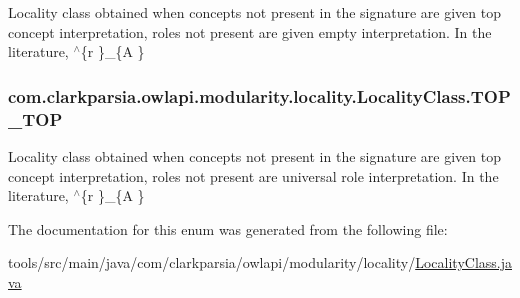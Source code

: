 Locality class obtained when concepts not present in the signature are given top concept interpretation, roles not present are given empty interpretation. In the literature, $^\wedge$\{r  \}\-\_\-\{A  \} \hypertarget{enumcom_1_1clarkparsia_1_1owlapi_1_1modularity_1_1locality_1_1_locality_class_a5ec2368660cbebbd0dab9e6a4df1bcb7}{
\subsubsection[{T\-O\-P\-\_\-\-T\-O\-P}]{\setlength{\rightskip}{0pt plus 5cm}com.\-clarkparsia.\-owlapi.\-modularity.\-locality.\-Locality\-Class.\-T\-O\-P\-\_\-\-T\-O\-P}}\label{enumcom_1_1clarkparsia_1_1owlapi_1_1modularity_1_1locality_1_1_locality_class_a5ec2368660cbebbd0dab9e6a4df1bcb7}
Locality class obtained when concepts not present in the signature are given top concept interpretation, roles not present are universal role interpretation. In the literature, $^\wedge$\{r    \}\-\_\-\{A  \} 

The documentation for this enum was generated from the following file\-:\begin{DoxyCompactItemize}
\item 
tools/src/main/java/com/clarkparsia/owlapi/modularity/locality/\hyperlink{_locality_class_8java}{Locality\-Class.\-java}\end{DoxyCompactItemize}
